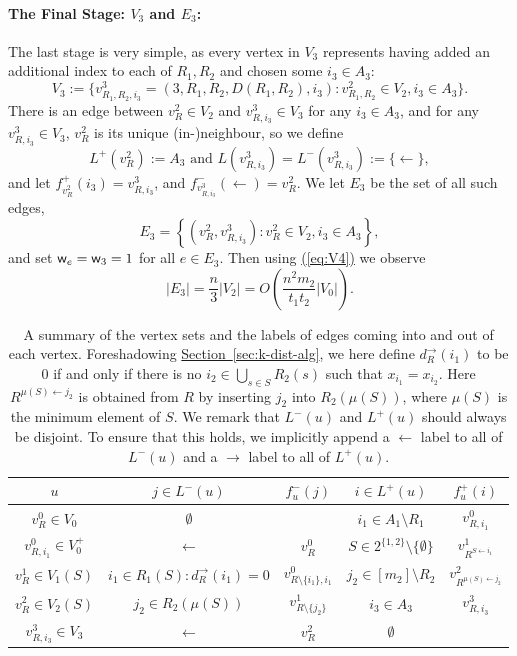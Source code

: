 \documentclass{article}
\newcommand{\eq}[1]{\hyperref[eq:#1]{(\ref*{eq:#1})}}
\renewcommand{\sec}[1]{\hyperref[sec:#1]{Section~\ref*{sec:#1}}}
\renewcommand{\>}{\rangle}
\newcommand{\<}{\langle}
\renewcommand{\(}{\left(}
\renewcommand{\)}{\right)}
\def\w{{\sf w}}
\begin{document}
\paragraph{The Final Stage: $V_3$ and $E_3$:} The last stage is very simple, as every vertex in $V_3$ represents having added an additional index to each of $R_1, R_2$ and chosen some $i_3 \in A_3$:
$$V_3:=\{v^3_{R_1,R_2,i_3}=(3,R_1,R_2,D(R_1,R_2),i_3):v^2_{R_1,R_2}\in V_2, i_3\in A_3\}.$$
There is an edge between $v^2_{R}\in V_2$ and $v^3_{R,i_3}\in V_3$ for any $i_3\in A_3$, and for any $v^3_{R,i_3}\in V_3$, $v^2_{R}$ is its unique (in-)neighbour, so we define
$$L^+(v_{R}^2):=A_3
\mbox{ and }
L(v_{R,i_3}^3)=L^-(v_{R,i_3}^3):=\{\leftarrow\},$$
and let $f^+_{v_{R}^2}(i_3) = v_{R,i_3}^3$, and $f^-_{v_{R,i_3}^3}(\leftarrow) = v_{R}^2$. We let $E_3$ be the set of all such edges,
$$E_3=\left\{\left(v^2_{R},v^3_{R,i_3}\right):v^2_{R}\in V_2, i_3 \in A_3\right\},$$
and set $\w_e = \w_3=1$ for all $e \in E_3$. Then using \eq{V4} we observe
\begin{equation}
|E_3|=\frac{n}{3}|V_2|= O\left(\frac{n^2m_2}{t_1t_2}|V_0|\right).\label{eq:E4}
\end{equation}

\begin{table}
\renewcommand{\arraystretch}{1.5}
\centering
\begin{tabular}{ |c|c|c|c|c|}
\hline
 $u$ & $j\in L^-(u)$ & $f^-_u(j)$ & $i\in L^+(u)$ & $f^+_u(i)$\\
\hline
\hline
$v^0_{R}\in V_0$ & $\emptyset$ & & $ i_1\in A_1\setminus R_1$ & $v_{R,i_1}^0$\\
\hline
$v^0_{R,i_1}\in V_0^+$ & $\leftarrow$ & $v_R^0$ & $S\in 2^{\{1,2\}} \setminus \{\emptyset\}$ & $v_{R^{S\leftarrow i_1}}^1$\\
\hline
$v^1_{R}\in V_1(S)$ & $i_1\in R_1(S):d_R^{\rightarrow}(i_1)=0$ & $v_{R\setminus\{i_1\},i_1}^0$ & $j_2\in [m_2]\setminus R_2$ & $v_{R^{\mu(S)\leftarrow j_2}}^2$\\
\hline
$v^2_{R}\in V_2(S)$ & $j_2\in R_2(\mu(S))$ & $v_{R\setminus\{j_2\}}^1$ &  $i_3\in A_3$ & $v_{R,i_3}^3$\\
\hline
$v^3_{R,i_3}\in V_3$ & $\leftarrow$ & $v_{R}^{2}$ & $\emptyset$ &\\
\hline
\end{tabular}
\caption{A summary of the vertex sets and the labels of edges coming into and out of each vertex. 
Foreshadowing \sec{k-dist-alg}, we here define $d_R^{\rightarrow}(i_1)$ to be 0 if and only if there is no $i_2\in \bigcup_{s\in S}R_2(s)$ such that $x_{i_1}=x_{i_2}$. Here $R^{\mu(S)\leftarrow j_2}$ is obtained from $R$ by inserting $j_2$ into $R_2(\mu(S))$, where $\mu(S)$ is the minimum element of $S$. We remark that $L^-(u)$ and $L^+(u)$ should always be disjoint. To ensure that this holds, we implicitly append a $\leftarrow$ label to all of $L^-(u)$ and a $\rightarrow$ label to all of $L^+(u)$.
}\label{tab:3-dist-index-sets}
\end{table}
\end{document}
